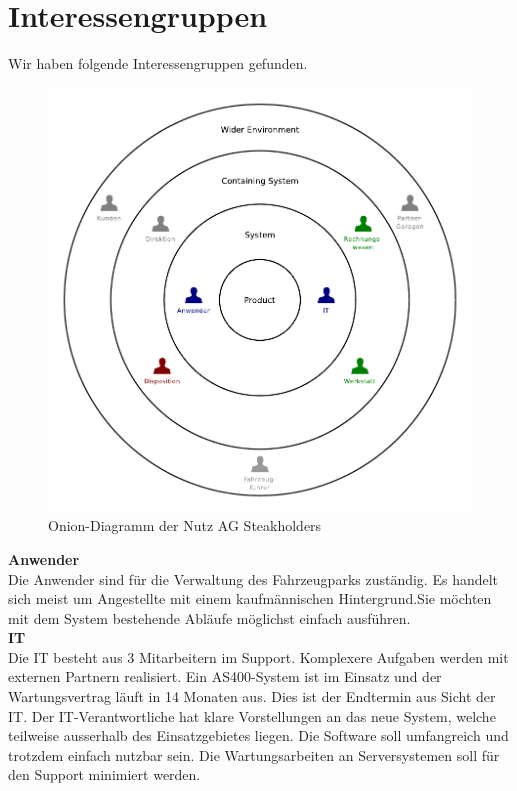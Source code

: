 \section{Interessengruppen}
%
Wir haben folgende Interessengruppen gefunden.
\begin{center}
  \begin{figure}[ht]
    \includegraphics{aufgabe1/graphics/onion.pdf}
    \caption{Onion-Diagramm der Nutz AG Steakholders}
    \label{fig:awesome_image}
  \end{figure}
\end{center}
%
\textbf{Anwender}\\
Die Anwender sind für die Verwaltung des Fahrzeugparks zuständig. Es handelt sich meist um Angestellte mit einem kaufmännischen Hintergrund.Sie möchten mit dem System bestehende Abläufe möglichst einfach ausführen. 
\\[6ex]
%
\textbf{IT}\\
Die IT besteht aus 3 Mitarbeitern im Support. Komplexere Aufgaben werden mit externen Partnern realisiert. Ein AS400-System ist im Einsatz und der Wartungsvertrag läuft in 14 Monaten aus. Dies ist der Endtermin aus Sicht der IT. Der IT-Verantwortliche hat klare Vorstellungen an das neue System, welche teilweise ausserhalb des Einsatzgebietes liegen. Die Software soll umfangreich und trotzdem einfach nutzbar sein. Die Wartungsarbeiten an Serversystemen soll für den Support minimiert werden.
